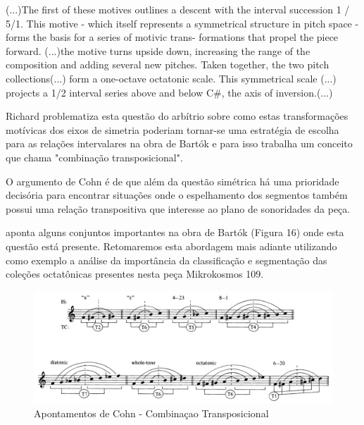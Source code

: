 \documentclass[
	12pt,				%
	openright,			%
	twoside,			%
	a4paper,			%
	english,			%
	french,				%
	spanish,			%
	brazil				%
	]{abntex2}
\begin{document}
\begin{citacao}
(...)The first of these motives outlines a descent with the interval
succession 1 / 5/1. This motive - which itself represents a symmetrical
structure in pitch space - forms the basis for a series of motivic trans-
formations that propel the piece forward. (...)the motive turns
upside down, increasing the range of the composition and adding
several new pitches. Taken together, the two pitch collections(...)
form a one-octave octatonic scale. This symmetrical scale (...)
projects a 1/2 interval series above and below C\#, the axis of
inversion.(...)
\cite{pearsall2004symmetry}
\end{citacao}

Richard  problematiza esta questão do arbítrio sobre como estas transformações motívicas dos eixos de simetria poderiam tornar-se uma estratégia de escolha para as relações intervalares na obra de Bartók e para isso trabalha um conceito que chama "combinação transposicional". 

O argumento de Cohn é de que além da questão simétrica há uma prioridade decisória para encontrar situações onde o espelhamento dos segmentos também possui uma relação transpositiva que interesse ao plano de sonoridades da peça.

 aponta alguns conjuntos importantes na obra de Bartók (Figura 16) onde esta questão está presente. Retomaremos esta abordagem mais adiante utilizando como exemplo a análise da importância da classificação e segmentação das coleções octatônicas presentes nesta peça Mikrokosmos 109.\cite{cohn1991bartok}

\begin{figure}[!h]
	\caption{\label{fig_grafico}Apontamentos de Cohn - Combinaçao Transposicional}
	\begin{center}
	    \includegraphics[scale=0.4]{axis/TCCohn.png}
	\end{center}
\end{figure}
\end{document}
